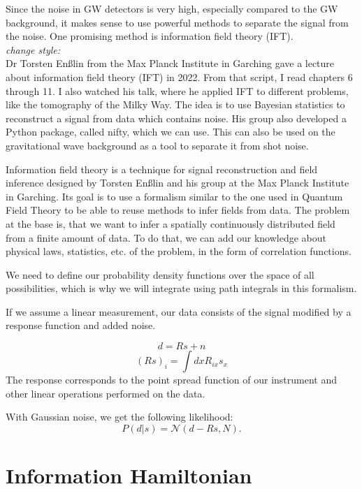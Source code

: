 Since the noise in GW detectors is very high, especially compared to the GW background, it makes sense to use powerful methods to separate the signal from the noise. One promising method is information field theory (IFT).
\\
\textit{change style:}
\\
Dr Torsten Enßlin from the Max Planck Institute in Garching gave a lecture about 
information field theory (IFT) in 2022. From that script, I read chapters 6 through 11. 
I also watched his talk, where he applied IFT to different problems, like the
tomography of the Milky Way.  The idea is to use Bayesian statistics to reconstruct 
a signal from data which contains noise. His group also developed a Python package, 
called nifty, which we can use. This can also be used on the gravitational wave 
background as a tool to separate it from shot noise.


Information field theory is a technique for signal reconstruction
and field inference designed by Torsten Enßlin and his group at the 
Max Planck Institute in Garching.
Its goal is to use a formalism similar to the one used in Quantum Field
Theory to be able to reuse methods to infer fields from data. The problem
at the base is, that we want to infer a spatially continuously distributed field
from a finite amount of data. To do that, we can add our knowledge about 
physical laws, statistics, etc. of the problem, in the form of correlation functions.

We need to define our probability density functions over the space of all
possibilities, which is why we will integrate using path integrals in 
this formalism.

If we assume a linear measurement, our data consists of the signal modified by a response function and added noise.

\begin{equation}
    d = R s + n
\end{equation}
\begin{equation}
    (R s)_i = \int dx R_{ix} s_{x}
\end{equation}
The response corresponds to the point spread function of our instrument and
other linear operations performed on the data.

With Gaussian noise, we get the following likelihood:
\begin{equation}
    P(d|s) = \mathcal{N}(d-Rs, N) .
\end{equation}

\section{Information Hamiltonian}

